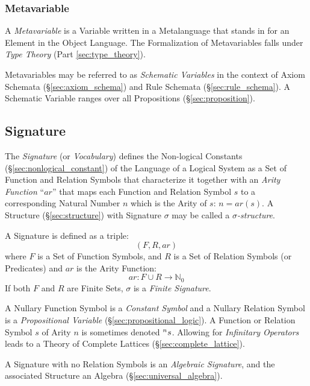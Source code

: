 \subsubsection{Metavariable}\label{sec:metavariable}

A \emph{Metavariable} is a Variable written in a Metalanguage that
stands in for an Element in the Object Language. The Formalization of
Metavariables falls under \emph{Type Theory} (Part
\ref{sec:type_theory}).

Metavariables may be referred to as \emph{Schematic Variables} in the
context of Axiom Schemata (\S\ref{sec:axiom_schema}) and Rule Schemata
(\S\ref{sec:rule_schema}). A Schematic Variable ranges over all
Propositions (\S\ref{sec:proposition}).



\subsection{Signature}\label{sec:signature}

The \emph{Signature} (or \emph{Vocabulary}) defines the Non-logical
Constants (\S\ref{sec:nonlogical_constant}) of the Language of a
Logical System as a Set of Function and Relation Symbols that
characterize it together with an \emph{Arity Function} ``$ar$'' that
maps each Function and Relation Symbol $s$ to a corresponding Natural
Number $n$ which is the Arity of $s$: $n = ar(s)$. A Structure
(\S\ref{sec:structure}) with Signature $\sigma$ may be called a
\emph{$\sigma$-structure}.

A Signature is defined as a triple:
\[
    (F,R,ar)
\]
where $F$ is a Set of Function Symbols, and $R$ is a Set of Relation
Symbols (or Predicates) and $ar$ is the Arity Function:
\[
    ar: F \cup R \rightarrow \mathbb{N}_0
\]
If both $F$ and $R$ are Finite Sets, $\sigma$ is a \emph{Finite
  Signature}.

A Nullary Function Symbol is a \emph{Constant Symbol} and a Nullary
Relation Symbol is a \emph{Propositional Variable}
(\S\ref{sec:propositional_logic}). A Function or Relation Symbol $s$
of Arity $n$ is sometimes denoted $\prescript{n}{}{s}$. Allowing for
\emph{Infinitary Operators} leads to a Theory of Complete Lattices
(\S\ref{sec:complete_lattice}).

A Signature with no Relation Symbols is an \emph{Algebraic Signature},
and the associated Structure an Algebra
(\S\ref{sec:universal_algebra}).

